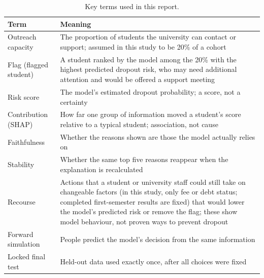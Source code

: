 \begin{table}[!htb]
\centering
\caption{Key terms used in this report.}
\label{tab:terms}
\footnotesize
\setlength{\tabcolsep}{3pt}
\begin{tabular}{@{}>{\raggedright\arraybackslash}p{2.0cm}p{6.0cm}@{}}
\toprule
\textbf{Term} & \textbf{Meaning} \\
\midrule
Outreach capacity & The proportion of students the university can contact or support; assumed in this study to be 20\% of a cohort \\
Flag (flagged student) & A student ranked by the model among the 20\% with the highest predicted dropout risk, who may need additional attention and would be offered a support meeting \\
Risk score & The model's estimated dropout probability; a score, not a certainty \\
Contribution (SHAP) & How far one group of information moved a student's score relative to a typical student; association, not cause \\
Faithfulness & Whether the reasons shown are those the model actually relies on \\
Stability & Whether the same top five reasons reappear when the explanation is recalculated \\
Recourse & Actions that a student or university staff could still take on changeable factors (in this study, only fee or debt status; completed first-semester results are fixed) that would lower the model's predicted risk or remove the flag; these show model behaviour, not proven ways to prevent dropout \\
Forward simulation & People predict the model's decision from the same information \\
Locked final test & Held-out data used exactly once, after all choices were fixed \\
\bottomrule
\end{tabular}
\end{table}
